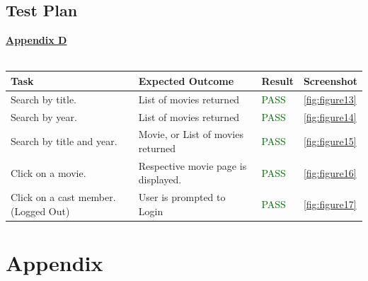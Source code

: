 \documentclass[12pt,a4paper]{article}
\begin{document}
		\subsection{Test Plan}
			\hyperref[subsec:appendixD]{\textbf{Appendix D}}\\
			\\
			\begin{tabular}{|p{}|p{}|p{}|p{}|}
				\hline
				\rowcolor{gray!30}
				\textbf{Task} & 
				\textbf{Expected Outcome} & 
				\textbf{Result} & 
				\textbf{Screenshot} \\
				\hline
				Search by title. & 
				List of movies returned & 
				\textcolor{darkgreen}{PASS} & 
				\cref{fig:figure13} \\
				\hline
				Search by year. & 
				List of movies returned & 
				\textcolor{darkgreen}{PASS} & 
				\cref{fig:figure14} \\
				\hline
				Search by title and year. &
				Movie, or List of movies returned & 
				\textcolor{darkgreen}{PASS} &
				\cref{fig:figure15} \\
				\hline
				Click on a movie. &
				Respective movie page is displayed. &
				\textcolor{darkgreen}{PASS} &
				\cref{fig:figure16} \\
				\hline
				Click on a cast member.
				(Logged Out) &
				User is prompted to Login &
				\textcolor{darkgreen}{PASS} &
				\cref{fig:figure17} \\
				\hline
			\end{tabular}
	
	\newpage

	\section{Appendix}
\end{document}
